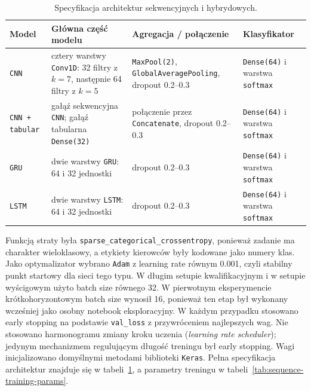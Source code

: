 \documentclass[printmode,pl]{mgr}
\begin{document}
\begin{table}[H]
\centering
\footnotesize
\setlength{\tabcolsep}{5pt}
\renewcommand{\arraystretch}{1.25}
\begin{tabularx}{\textwidth}{%
  >{\raggedright\arraybackslash}p{1.9cm}%
  >{\raggedright\arraybackslash}X%
  >{\raggedright\arraybackslash}p{3.7cm}%
  >{\raggedright\arraybackslash}p{2.7cm}}
\toprule
Model & Główna część modelu & Agregacja / połączenie & Klasyfikator \\
\midrule
\texttt{CNN} & cztery warstwy \texttt{Conv1D}: 32 filtry z \(k=7\), następnie 64 filtry z \(k=5\) & \texttt{MaxPool(2)}, \texttt{GlobalAveragePooling}, dropout 0.2--0.3 & \texttt{Dense(64)} i warstwa \texttt{softmax} \\
\texttt{CNN + tabular} & gałąź sekwencyjna \texttt{CNN}; gałąź tabularna \texttt{Dense(32)} & połączenie przez \texttt{Concatenate}, dropout 0.2--0.3 & \texttt{Dense(64)} i warstwa \texttt{softmax} \\
\texttt{GRU} & dwie warstwy \texttt{GRU}: 64 i 32 jednostki & dropout 0.2--0.3 & \texttt{Dense(64)} i warstwa \texttt{softmax} \\
\texttt{LSTM} & dwie warstwy \texttt{LSTM}: 64 i 32 jednostki & dropout 0.2--0.3 & \texttt{Dense(64)} i warstwa \texttt{softmax} \\
\bottomrule
\end{tabularx}
\caption{Specyfikacja architektur sekwencyjnych i hybrydowych.}
\label{tab:sequence-architecture-spec}
\end{table}

Funkcją straty była \texttt{sparse\_categorical\_crossentropy}, ponieważ zadanie ma charakter wieloklasowy, a etykiety kierowców były kodowane jako numery klas. Jako optymalizator wybrano \texttt{Adam} z learning rate równym 0.001, czyli stabilny punkt startowy dla sieci tego typu. W długim setupie kwalifikacyjnym i w setupie wyścigowym użyto batch size równego 32. W pierwotnym eksperymencie krótkohoryzontowym batch size wynosił 16, ponieważ ten etap był wykonany wcześniej jako osobny notebook eksploracyjny. W każdym przypadku stosowano early stopping na podstawie \texttt{val\_loss} z przywróceniem najlepszych wag. Nie stosowano harmonogramu zmiany kroku uczenia (\emph{learning rate scheduler}); jedynym mechanizmem regulującym długość treningu był early stopping. Wagi inicjalizowano domyślnymi metodami biblioteki \texttt{Keras}. Pełna specyfikacja architektur znajduje się w tabeli~\ref{tab:sequence-architecture-spec}, a parametry treningu w tabeli~\ref{tab:sequence-training-params}.
\end{document}
